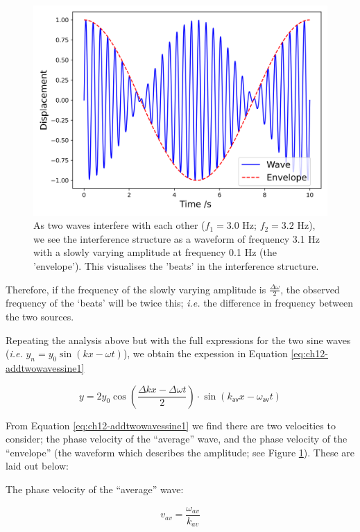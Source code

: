 \documentclass[
]{book}
\begin{document}
\begin{figure}

{\centering \includegraphics[width=0.7\linewidth]{visualisations/ch12-beats1} 

}

\caption{As two waves interfere with each other ($f_1 = 3.0$ Hz; $f_2 = 3.2$ Hz), we see the interference structure as a waveform of frequency 3.1 Hz with a slowly varying amplitude at frequency 0.1 Hz (the 'envelope'). This visualises the 'beats' in the interference structure.}\label{fig:ch12-oscillationbeats1}
\end{figure}

Therefore, if the frequency of the slowly varying amplitude is \(\frac{\Delta \omega}{2}\), the observed frequency of the `beats' will be twice this; \emph{i.e.} the difference in frequency between the two sources.

Repeating the analysis above but with the full expressions for the two sine waves (\emph{i.e.} \(y_n = y_0 \sin(kx - \omega t)\)), we obtain the expession in Equation \eqref{eq:ch12-addtwowavessine1}

\begin{equation}
y= 2 y_{0} \cos \left (\frac{\Delta kx - \Delta\omega t}{2}\right) \cdot \sin(k_\textsf{av}x - \omega_\textsf{av}t )
\label{eq:ch12-addtwowavessine1}
\end{equation}

From Equation \eqref{eq:ch12-addtwowavessine1} we find there are two velocities to consider; the phase velocity of the ``average'' wave, and the phase velocity of the ``envelope'' (the waveform which describes the amplitude; see Figure \ref{fig:ch12-oscillationbeats1}). These are laid out below:

The phase velocity of the ``average'' wave:

\begin{equation}
v_{av} = \frac{\omega_{av}}{k_{av}}
\end{equation}
\end{document}
